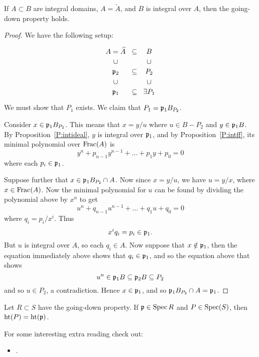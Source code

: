 \documentclass{ximera}
\begin{document}
\begin{theorem}
  If $A\subset B$ are integral domains, $A=\tilde{A}$, and $B$ is
  integral over $A$, then the going-down property holds.
  \begin{proof}
    We have the following setup:
    \[
    \begin{tikzcd}[row sep=0em,column sep=0em]
      A=\tilde{A}    & \subset & B \\
      \cup &         & \cup \\
      \p_2 & \subset & P_2 \\
      \cup &         & \cup \\
      \p_1 & \subset & \exists P_1  
    \end{tikzcd}
    \]
    We must show that $P_1$ exists. We claim that $P_1 = \mathfrak{p}_1 B_{P_2}$.

    Consider $x\in \mathfrak{p}_1 B_{P_2}$. This means that $x = y/u$ where
    $u\in B-P_2$ and $y\in \mathfrak{p}_1 B$. By Proposition~\ref{P:intideal},
    $y$ is integral over $\mathfrak{p}_1$, and by Proposition~\ref{P:intff}, its
    minimal polynomial over $\operatorname{Frac}(A)$ is
    \[
    y^n + p_{n-1}y^{n-1} + \dots + p_1 y + p_0 = 0
    \]
    where each $p_i\in\mathfrak{p}_1$.

    Suppose further that $x\in \mathfrak{p}_1 B_{P_2}\cap A$. Now since $x =
    y/u$, we have $u = y/x$, where $x\in\operatorname{Frac}(A)$. Now the minimal
    polynomial for $u$ can be found by dividing the polynomial above
    by $x^n$ to get
    \[
    u^n + q_{n-1} u^{n-1} + \dots + q_1 u + q_0 = 0
    \]
    where $q_i = p_i/x^i$. Thus
    \[
    x^i q_i = p_i \in \mathfrak{p}_1.
    \]
    But $u$ is integral over $A$, so each $q_i\in A$. Now suppose that
    $x\notin\mathfrak{p}_1$, then the equation immediately above shows that
    $q_i\in\mathfrak{p}_1$, and so the equation above that shows
    \[
    u^n\in \mathfrak{p}_1 B \subseteq \mathfrak{p}_2 B \subseteq P_2
    \]
    and so $u\in P_2$, a contradiction. Hence $x\in \mathfrak{p}_1$, and so
    $\mathfrak{p}_1 B_{P_2}\cap A = \mathfrak{p}_1$.
  \end{proof}
\end{theorem}



\begin{corollary}
  Let $R\subset S$ have the going-down property. If $\mathfrak{p}\in\operatorname{Spec}{R}$
  and $P\in\operatorname{Spec}(S)$, then $\operatorname{ht}(P)= \operatorname{ht}(\mathfrak{p})$.
\end{corollary}



For some interesting extra reading check out:
\begin{itemize}
\item {}.
\end{itemize}
\end{document}
